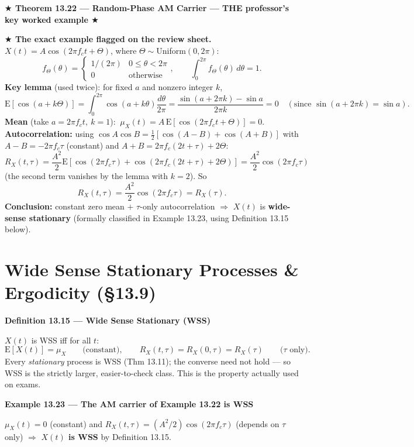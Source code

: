 \documentclass[11pt]{article}
\newcommand{\E}[1]{\mathrm{E}\left[#1\right]}
\newcommand{\topline}[1]{\par\vspace{5pt}\noindent{\color{#1}\rule{\linewidth}{1.1pt}}\par\vspace{3pt}}
\newcommand{\botline}[1]{\par\vspace{2pt}\noindent{\color{#1}\rule{\linewidth}{1.1pt}}\par\vspace{8pt}}
\newenvironment{defbox}[2]{%
  \topline{defcol}\noindent\textbf{\color{defcol}Definition #1 --- #2}\par\smallskip\noindent\ignorespaces
}{\botline{defcol}}
\newenvironment{flagbox}[2]{%
  \topline{flagcol}\vspace{-9pt}\topline{flagcol}%
  \noindent\textbf{\color{flagcol}$\bigstar$ Theorem #1 --- #2 $\bigstar$ \; [PROFESSOR-FLAGGED --- MEMORIZE]}\par\smallskip\noindent\ignorespaces
}{\botline{flagcol}\vspace{-9pt}\botline{flagcol}}
\newenvironment{exbox}[2]{%
  \topline{exmcol}\noindent\textbf{\color{exmcol}Example #1 --- #2}\par\smallskip\noindent\ignorespaces
}{\botline{exmcol}}
\begin{document}
\begin{flagbox}{13.22}{Random-Phase AM Carrier --- THE professor's key worked example}
\textbf{$\bigstar$ The exact example flagged on the review sheet.}\\
$X(t) = A\cos(2\pi f_c t+\Theta)$, where $\Theta\sim$Uniform$(0,2\pi)$:
\[ f_\Theta(\theta) = \begin{cases}1/(2\pi) & 0\le\theta<2\pi\\ 0 & \text{otherwise}\end{cases}, \qquad
\int_0^{2\pi} f_\Theta(\theta)\,d\theta = 1. \]
\textbf{Key lemma} (used twice): for fixed $a$ and nonzero integer $k$,
\[ \E{\cos(a+k\Theta)} = \int_0^{2\pi}\cos(a+k\theta)\frac{d\theta}{2\pi} = \frac{\sin(a+2\pi k)-\sin a}{2\pi k}=0 \quad (\text{since }\sin(a{+}2\pi k)=\sin a). \]
\textbf{Mean} (take $a=2\pi f_ct,\ k=1$): $\ \mu_X(t)=A\,\E{\cos(2\pi f_ct+\Theta)}=0$.\\[4pt]
\textbf{Autocorrelation:} using $\cos A\cos B=\tfrac12[\cos(A{-}B)+\cos(A{+}B)]$ with
$A-B=-2\pi f_c\tau$ (constant) and $A+B=2\pi f_c(2t+\tau)+2\Theta$:
\[
R_X(t,\tau)=\frac{A^2}{2}\E{\cos(2\pi f_c\tau) + \cos(2\pi f_c(2t+\tau)+2\Theta)} = \frac{A^2}{2}\cos(2\pi f_c\tau)
\]
(the second term vanishes by the lemma with $k=2$). So
\[ \boxed{R_X(t,\tau) = \frac{A^2}{2}\cos(2\pi f_c\tau) = R_X(\tau).} \]
\textbf{Conclusion:} constant zero mean $+$ $\tau$-only autocorrelation $\Rightarrow$ $X(t)$ is
\textbf{wide-sense stationary} (formally classified in Example 13.23, using Definition 13.15
below).
\end{flagbox}

\clearpage
\section{Wide Sense Stationary Processes \& Ergodicity (\S13.9)}
\label{sec:139}

\begin{defbox}{13.15}{Wide Sense Stationary (WSS)}
$X(t)$ is WSS iff for all $t$:
\[ \E{X(t)} = \mu_X \qquad\text{(constant)}, \qquad R_X(t,\tau) = R_X(0,\tau) = R_X(\tau) \qquad\text{($\tau$ only)}. \]
Every \emph{stationary} process is WSS (Thm 13.11); the converse need not hold --- so WSS is
the strictly larger, easier-to-check class. This is the property actually used on exams.
\end{defbox}

\begin{exbox}{13.23}{The AM carrier of Example 13.22 is WSS}
$\mu_X(t)=0$ (constant) and $R_X(t,\tau)=(A^2/2)\cos(2\pi f_c\tau)$ (depends on $\tau$ only)
$\Rightarrow$ \textbf{$X(t)$ is WSS} by Definition 13.15.
\end{exbox}
\end{document}
